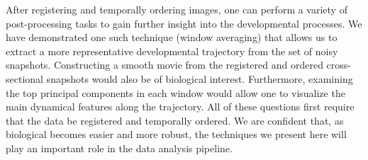 \documentclass{pnastwo}
\begin{document}
\begin{article}
After registering and temporally ordering images, one can perform a variety of post-processing tasks to gain further insight into the developmental processes.
%
We have demonstrated one such technique (window averaging) that allows us to extract a more representative developmental trajectory from the set of noisy snapshots. 
%
Constructing a smooth movie from the registered and ordered cross-sectional snapshots would also be of biological interest.
%
Furthermore, examining the top principal components in each window would allow one to visualize the main dynamical features along the trajectory.
%
All of these questions first require that the data be registered and temporally ordered.
%
We are confident that, as biological becomes easier and more robust, the techniques we present here will play an important role in the data analysis pipeline. 


 






\end{article}
\end{document}
